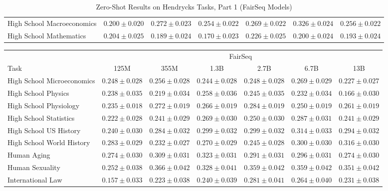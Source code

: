 \documentclass[11pt]{article}
\begin{document}
{\begin{landscape}
\begin{table}
\begin{tabular}{l c c c c c c }
High School Macroeconomics & $0.200 \pm 0.020$ & $0.272 \pm 0.023$ & $0.254 \pm 0.022$ & $0.269 \pm 0.022$ & $0.326 \pm 0.024$ & $0.256 \pm 0.022$ \\ 
High School Mathematics & $0.204 \pm 0.025$ & $0.189 \pm 0.024$ & $0.170 \pm 0.023$ & $0.226 \pm 0.025$ & $0.200 \pm 0.024$ & $0.193 \pm 0.024$ \\ 
\bottomrule
\end{tabular}
\caption{Zero-Shot Results on Hendrycks Tasks, Part 1 (FairSeq Models)}
\label{tab:hendrycks-fair1}
\end{table}

\begin{table}    
\centering %
\begin{tabular}{l c c c c c c }
 & \multicolumn{6}{c}{FairSeq} \\
Task & 125M & 355M & 1.3B & 2.7B & 6.7B & 13B\\ \toprule
High School Microeconomics & $0.248 \pm 0.028$ & $0.256 \pm 0.028$ & $0.244 \pm 0.028$ & $0.248 \pm 0.028$ & $0.269 \pm 0.029$ & $0.227 \pm 0.027$ \\ 
High School Physics & $0.238 \pm 0.035$ & $0.219 \pm 0.034$ & $0.258 \pm 0.036$ & $0.245 \pm 0.035$ & $0.232 \pm 0.034$ & $0.166 \pm 0.030$ \\ 
High School Physiology & $0.235 \pm 0.018$ & $0.272 \pm 0.019$ & $0.266 \pm 0.019$ & $0.284 \pm 0.019$ & $0.250 \pm 0.019$ & $0.261 \pm 0.019$ \\ 
High School Statistics & $0.222 \pm 0.028$ & $0.241 \pm 0.029$ & $0.269 \pm 0.030$ & $0.250 \pm 0.030$ & $0.287 \pm 0.031$ & $0.241 \pm 0.029$ \\ 
High School US History & $0.240 \pm 0.030$ & $0.284 \pm 0.032$ & $0.299 \pm 0.032$ & $0.299 \pm 0.032$ & $0.314 \pm 0.033$ & $0.294 \pm 0.032$ \\ 
High School World History & $0.283 \pm 0.029$ & $0.232 \pm 0.027$ & $0.270 \pm 0.029$ & $0.245 \pm 0.028$ & $0.300 \pm 0.030$ & $0.316 \pm 0.030$ \\ 
Human Aging & $0.274 \pm 0.030$ & $0.309 \pm 0.031$ & $0.323 \pm 0.031$ & $0.291 \pm 0.031$ & $0.296 \pm 0.031$ & $0.274 \pm 0.030$ \\ 
Human Sexuality & $0.252 \pm 0.038$ & $0.366 \pm 0.042$ & $0.328 \pm 0.041$ & $0.359 \pm 0.042$ & $0.359 \pm 0.042$ & $0.351 \pm 0.042$ \\
International Law & $0.157 \pm 0.033$ & $0.223 \pm 0.038$ & $0.240 \pm 0.039$ & $0.281 \pm 0.041$ & $0.264 \pm 0.040$ & $0.231 \pm 0.038$ \\

\end{tabular}
\end{table}
\end{landscape}}
\end{document}
